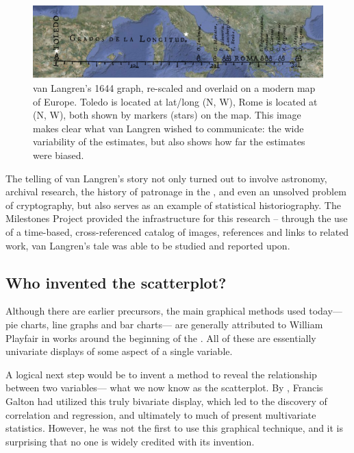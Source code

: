 \begin{figure}[htb]
 \centering
 \includegraphics[width=\textwidth]{fig/langren-google-overlay2}
 \caption{van Langren's 1644 graph, re-scaled and overlaid on a modern map of Europe. Toledo is located at lat/long %
(N, W), Rome is located at (N, W), both shown by markers (stars) on the map.  This image makes clear what van Langren wished to communicate: the wide variability of the estimates, but also shows how far the estimates were biased.}%
\label{fig:langren-google-overlay}
\end{figure}

The telling of van Langren's story not only turned out to involve astronomy, archival research, the history of patronage in the , and even an unsolved problem of cryptography, but also serves as an example of statistical historiography.  The Milestones Project provided the infrastructure for this research -- through the use of a time-based, cross-referenced catalog of images, references and links to related work, van Langren's tale was able to be studied and reported upon.

\subsection{Who invented the scatterplot?}
Although there are earlier precursors, the main graphical methods used today---
pie charts, line graphs and bar charts--- are generally attributed to
William Playfair in works around the beginning of the 
\citep{Playfair:1786,Playfair:1801}. All of these are essentially univariate
displays of some aspect of a single variable. 

A logical next step would be to invent a method to reveal the relationship between two variables--- what we now know as the scatterplot.  By \citeyear{Galton:1886}, Francis Galton had utilized this truly bivariate display, which led to the
discovery of correlation and regression, and ultimately to much of present multivariate
statistics. 
However, he was not the first to use this graphical technique, and it is surprising that no one is widely credited with its invention.

